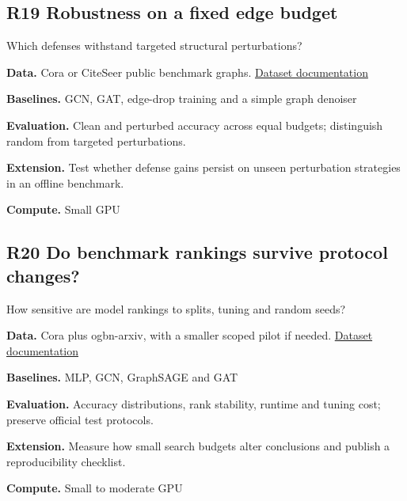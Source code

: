 \documentclass[11pt,letterpaper]{article}
\begin{document}
\begin{minipage}{\linewidth}\subsection*{R19 Robustness on a fixed edge budget}
Which defenses withstand targeted structural perturbations?\par\textbf{Data.} Cora or CiteSeer public benchmark graphs. \href{https://pytorch-geometric.readthedocs.io/en/latest/generated/torch_geometric.datasets.Planetoid.html}{Dataset documentation}\par
\textbf{Baselines.} GCN, GAT, edge-drop training and a simple graph denoiser\par
\textbf{Evaluation.} Clean and perturbed accuracy across equal budgets; distinguish random from targeted perturbations.\par
\textbf{Extension.} Test whether defense gains persist on unseen perturbation strategies in an offline benchmark.\par
\textbf{Compute.} Small GPU\par
\end{minipage}\par\vspace{8pt}
\begin{minipage}{\linewidth}\subsection*{R20 Do benchmark rankings survive protocol changes?}
How sensitive are model rankings to splits, tuning and random seeds?\par\textbf{Data.} Cora plus ogbn-arxiv, with a smaller scoped pilot if needed. \href{https://ogb.stanford.edu/docs/nodeprop/#ogbn-arxiv}{Dataset documentation}\par
\textbf{Baselines.} MLP, GCN, GraphSAGE and GAT\par
\textbf{Evaluation.} Accuracy distributions, rank stability, runtime and tuning cost; preserve official test protocols.\par
\textbf{Extension.} Measure how small search budgets alter conclusions and publish a reproducibility checklist.\par
\textbf{Compute.} Small to moderate GPU\par
\end{minipage}\par\vspace{8pt}
\end{document}
